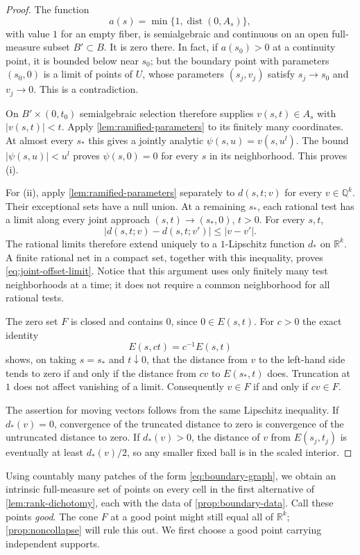 \begin{proof}
The function
\[
 a(s)=\min\{1,\operatorname{dist}(0,A_s)\},
\]
with value $1$ for an empty fiber, is semialgebraic and continuous on an open full-measure subset $B'\subset B$.  It is zero there.  In fact, if $a(s_0)>0$ at a continuity point, it is bounded below near $s_0$; but the boundary point with parameters $(s_0,0)$ is a limit of points of $U$, whose parameters $(s_j,v_j)$ satisfy $s_j\to s_0$ and $v_j\to0$.  This is a contradiction.

On $B'\times(0,t_0)$ semialgebraic selection therefore supplies $v(s,t)\in A_s$ with $|v(s,t)|<t$.  Apply \cref{lem:ramified-parameters} to its finitely many coordinates. At almost every $s_*$ this gives a jointly analytic $\psi(s,u)=v(s,u^l)$.  The bound $|\psi(s,u)|<u^l$ proves $\psi(s,0)=0$ for every $s$ in its neighborhood.  This proves (i).

For (ii), apply \cref{lem:ramified-parameters} separately to $d(s,t;v)$ for every $v\in\mathbb{Q}^k$.  Their exceptional sets have a null union.  At a remaining $s_*$, each rational test has a limit along every joint approach $(s,t)\to(s_*,0)$, $t>0$.  For every $s,t$,
\[
 |d(s,t;v)-d(s,t;v')|\leq |v-v'|.
\]
The rational limits therefore extend uniquely to a $1$-Lipschitz function $d_*$ on $\mathbb{R}^k$.  A finite rational net in a compact set, together with this inequality, proves \eqref{eq:joint-offset-limit}.  Notice that this argument uses only finitely many test neighborhoods at a time; it does not require a common neighborhood for all rational tests.

The zero set $F$ is closed and contains $0$, since $0\in E(s,t)$. For $c>0$ the exact identity
\[
 E(s,ct)=c^{-1}E(s,t)
\]
shows, on taking $s=s_*$ and $t\downarrow0$, that the distance from $v$ to the left-hand side tends to zero if and only if the distance from $cv$ to $E(s_*,t)$ does.  Truncation at $1$ does not affect vanishing of a limit.  Consequently $v\in F$ if and only if $cv\in F$.

The assertion for moving vectors follows from the same Lipschitz inequality.  If $d_*(v)=0$, convergence of the truncated distance to zero is convergence of the untruncated distance to zero.  If $d_*(v)>0$, the distance of $v$ from $E(s_j,t_j)$ is eventually at least $d_*(v)/2$, so any smaller fixed ball is in the scaled interior.
\end{proof}

Using countably many patches of the form \eqref{eq:boundary-graph}, we obtain an intrinsic full-measure set of points on every cell in the first alternative of \cref{lem:rank-dichotomy}, each with the data of \cref{prop:boundary-data}.  Call these points \emph{good}. The cone $F$ at a good point might still equal all of $\mathbb{R}^k$; \cref{prop:noncollapse} will rule this out.  We first choose a good point carrying independent supports.

